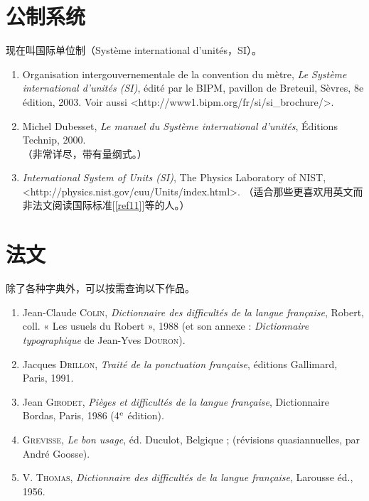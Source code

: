 \section{公制系统}

现在叫国际单位制（Système international d'unités，SI）。

\begin{enumerate}[resume]
    \item Organisation intergouvernementale de la convention du mètre, \emph{Le Système international d'unités (SI)}, édité par le BIPM, pavillon de Breteuil, Sèvres, 8e édition, 2003. Voir aussi <http://www1.bipm.org/fr/si/si\_brochure/>. \label{ref11}
    \item Michel Dubesset, \emph{Le manuel du Système international d'unités}, Éditions Technip, 2000.\\
    （非常详尽，带有量纲式。）
    \item \emph{International System of Units (SI)}, The Physics Laboratory of NIST, <http://physics.nist.gov/cuu/Units/index.html>.
    （适合那些更喜欢用英文而非法文阅读国际标准[\ref{ref11}]等的人。）
\end{enumerate}

\section{法文}

除了各种字典外，可以按需查询以下作品。

\begin{enumerate}[resume]
    \item Jean-Claude \textsc{Colin}, \emph{Dictionnaire des difficultés de la langue française}, Robert, coll. « Les usuels du Robert », 1988 (et son annexe : \emph{Dictionnaire typographique} de Jean-Yves \textsc{Douron}).
    \item Jacques \textsc{Drillon}, \emph{Traité de la ponctuation française}, éditions Gallimard, Paris, 1991.
    \item Jean \textsc{Girodet}, \emph{Pièges et difficultés de la langue française}, Dictionnaire Bordas, Paris, 1986 (4$^{\rm e}$ édition).
    \item \textsc{Grevisse}, \emph{Le bon usage}, éd. Duculot, Belgique ; (révisions quasiannuelles, par André Goosse).
    \item V. \textsc{Thomas}, \emph{Dictionnaire des difficultés de la langue française}, Larousse éd., 1956.
\end{enumerate}

